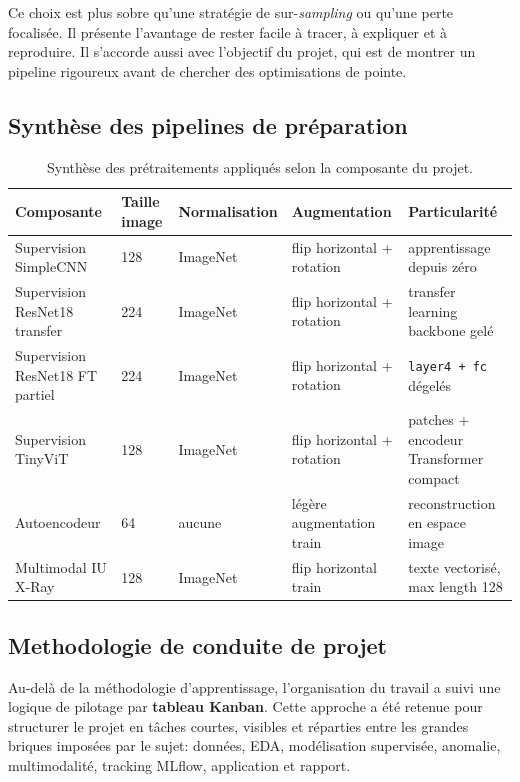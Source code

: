 \documentclass[11pt,a4paper]{article}
\begin{document}
Ce choix est plus sobre qu'une strat\'egie de sur-\emph{sampling} ou qu'une perte focalis\'ee. Il pr\'esente l'avantage de rester facile \`a tracer, \`a expliquer et \`a reproduire. Il s'accorde aussi avec l'objectif du projet, qui est de montrer un pipeline rigoureux avant de chercher des optimisations de pointe.

\subsection{Synth\`ese des pipelines de pr\'eparation}
\begin{table}[H]
    \centering
    \caption{Synth\`ese des pr\'etraitements appliqu\'es selon la composante du projet.}
    \small
    \begin{tabular}{p{3cm}p{2.4cm}p{3.1cm}p{2.4cm}p{3.3cm}}
        \toprule
        Composante & Taille image & Normalisation & Augmentation & Particularit\'e \\
        \midrule
        Supervision SimpleCNN & 128 & ImageNet & flip horizontal + rotation & apprentissage depuis z\'ero \\
        Supervision ResNet18 transfer & 224 & ImageNet & flip horizontal + rotation & transfer learning backbone gel\'e \\
        Supervision ResNet18 FT partiel & 224 & ImageNet & flip horizontal + rotation & \texttt{layer4 + fc} d\'egel\'es \\
        Supervision TinyViT & 128 & ImageNet & flip horizontal + rotation & patches + encodeur Transformer compact \\
        Autoencodeur & 64 & aucune & l\'eg\`ere augmentation train & reconstruction en espace image \\
        Multimodal IU X-Ray & 128 & ImageNet & flip horizontal train & texte vectoris\'e, max length 128 \\
        \bottomrule
    \end{tabular}
\end{table}

\subsection{Methodologie de conduite de projet}
Au-del\`a de la m\'ethodologie d'apprentissage, l'organisation du travail a suivi une logique de pilotage par \textbf{tableau Kanban}. Cette approche a \'et\'e retenue pour structurer le projet en t\^aches courtes, visibles et r\'eparties entre les grandes briques impos\'ees par le sujet: donn\'ees, EDA, mod\'elisation supervis\'ee, anomalie, multimodalit\'e, tracking MLflow, application et rapport.
\end{document}
